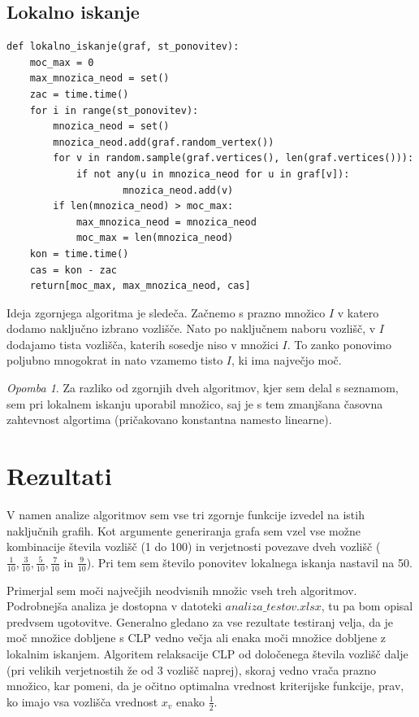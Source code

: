 \documentclass[a4paper, 12 pt]{article}
\theoremstyle{definition}
\theoremstyle{plain}
\theoremstyle{remark}
\newtheorem*{opomba}{Opomba}
\begin{document}
\subsection{Lokalno iskanje} \label{lokiskalgorit}
\begin{verbatim}
def lokalno_iskanje(graf, st_ponovitev):
    moc_max = 0 
    max_mnozica_neod = set() 
    zac = time.time()
    for i in range(st_ponovitev):
        mnozica_neod = set() 
        mnozica_neod.add(graf.random_vertex()) 
        for v in random.sample(graf.vertices(), len(graf.vertices())):
            if not any(u in mnozica_neod for u in graf[v]): 
                    mnozica_neod.add(v)
        if len(mnozica_neod) > moc_max: 
            max_mnozica_neod = mnozica_neod
            moc_max = len(mnozica_neod)
    kon = time.time()
    cas = kon - zac
    return[moc_max, max_mnozica_neod, cas]
\end{verbatim}

Ideja zgornjega algoritma je sledeča. Začnemo s prazno množico $I$ v katero dodamo naključno izbrano vozlišče. Nato po naključnem naboru vozlišč, v  $I$ dodajamo tista vozlišča, katerih sosedje niso v množici  $I$. To zanko ponovimo poljubno mnogokrat in nato vzamemo tisto  $I$, ki ima največjo moč.


\begin{opomba}
Za razliko od zgornjih dveh algoritmov, kjer sem delal s seznamom, sem pri lokalnem iskanju uporabil množico, saj je s tem zmanjšana časovna zahtevnost algortima (pričakovano konstantna namesto linearne).
\end{opomba}
\newpage
\section{Rezultati} %
V namen analize algoritmov sem vse tri zgornje funkcije izvedel na istih naključnih grafih. Kot argumente generiranja grafa sem vzel vse možne kombinacije števila vozlišč (1 do 100) in verjetnosti povezave dveh vozlišč ($\frac{1}{10}, \frac{3}{10}, \frac{5}{10}, \frac{7}{10}$ in $\frac{9}{10}$). Pri tem sem število ponovitev lokalnega iskanja nastavil na 50.

Primerjal sem moči največjih neodvisnih množic vseh treh algoritmov. Podrobnejša analiza je dostopna v datoteki $\textit{analiza\_testov.xlsx}$, tu pa bom opisal predvsem ugotovitve.  Generalno gledano za vse rezultate testiranj velja, da je moč množice dobljene s CLP vedno večja ali enaka moči množice dobljene z lokalnim iskanjem. Algoritem relaksacije CLP od določenega števila vozlišč dalje (pri velikih verjetnostih že od 3 vozlišč naprej), skoraj vedno vrača prazno množico, kar pomeni, da je očitno optimalna vrednost kriterijske funkcije, prav, ko imajo vsa vozlišča vrednost $x_v$ enako $\frac{1}{2}$.
\end{document}
